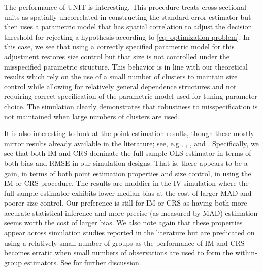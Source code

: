 \documentclass[preprint]{imsart}
\numberwithin{equation}{section}
\theoremstyle{plain}
\theoremstyle{definition}
\renewcommand{\(}{\left(}
\renewcommand{\)}{\right)}
\renewcommand{\[}{\left[}
\renewcommand{\]}{\right]}
\begin{document}
The performance of UNIT is interesting. This procedure treats cross-sectional units as spatially uncorrelated in constructing the standard error estimator but then uses a parametric model that has spatial correlation to adjust the decision threshold for rejecting a hypothesis according to \eqref{eq: optimization problem}. In this case, we see that using a correctly specified parametric model for this adjustment restores size control but that size is not controlled under the misspecified parametric structure. This behavior is in line with our theoretical results which rely on the use of a small number of clusters to maintain size control while allowing for relatively general dependence structures and not requiring correct specification of the parametric model used for tuning parameter choice. The simulation clearly demonstrates that robustness to misspecification is not maintained when large numbers of clusters are used.



It is also interesting to look at the point estimation results, though these mostly mirror results already available in the literature; see, e.g., \cite{Ibragimov2010}, \cite{BCH-inference}, and \cite{CGH:JAR}. Specifically, we see that both IM and CRS dominate the full sample OLS estimator in terms of both bias and RMSE in our simulation designs. That is, there appears to be a gain, in terms of both point estimation properties and size control, in using the IM or CRS procedure. The results are muddier in the IV simulation where the full sample estimator exhibits lower median bias at the cost of larger MAD and poorer size control. Our preference is still for IM or CRS as having both more accurate statistical inference and more precise (as measured by MAD) estimation seems worth the cost of larger bias. We also note again that these properties appear across simulation studies reported in the literature but are predicated on using a relatively small number of groups as the performance of IM and CRS becomes erratic when small numbers of observations are used to form the within-group estimators. See \cite{CGH:JAR} for further discussion.
\end{document}
